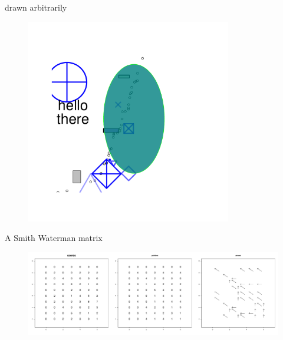 \documentclass[pdf]{beamer}
\begin{document}
\begin{frame}{drawn arbitrarily}
  \begin{figure}[ht]
    \includegraphics[width=0.8\textwidth]{R/arbitrary}
  \end{figure}
\end{frame}


\begin{frame}{A Smith Waterman matrix}
  \begin{figure}[ht]
    \includegraphics[width=\textwidth]{R/SM_drawing}
  \end{figure}
\end{frame}
\end{document}
